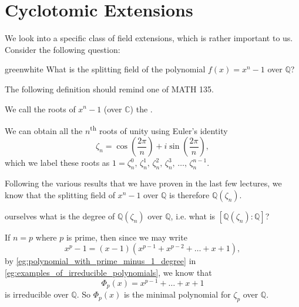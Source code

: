 \documentclass[notoc,notitlepage,nobib]{tufte-book}
\begin{document}

\section{Cyclotomic Extensions}%
\label{sec:cyclotomic_extensions}

We look into a specific class of field extensions, which is rather important to us.
Consider the following question:

\begin{quotebox}{green}{white}
  What is the splitting field of the polynomial $f(x) = x^n - 1$ over $\mathbb{Q}$?
\end{quotebox}

The following definition should remind one of MATH 135.

\begin{defn}\label{defn:_n_th_roots_of_unity}
  We call the roots of $x^n - 1$ (over $\mathbb{C}$) the .
\end{defn}

\begin{eg}
  We can obtain all the $n$\textsuperscript{th} roots of unity using Euler's identity
  \begin{equation*}
    \zeta_n = \cos \left( \frac{2\pi}{n} \right) + i \sin \left( \frac{2 \pi}{n} \right),
  \end{equation*}
  which we label these roots as $1 = \zeta_n^0,\, \zeta_n^1,\, \zeta_n^2,\,
  \zeta_n^3,\, \ldots,\, \zeta_n^{n - 1}$.
\end{eg}

Following the various results that we have proven in the last few lectures, we know that
the splitting field of $x^n - 1$ over $\mathbb{Q}$ is therefore
$\mathbb{Q}(\zeta_n)$.

 ourselves what is the degree of $\mathbb{Q}(\zeta_n)$ over
$\mathbb{Q}$, i.e. what is $[ \mathbb{Q}(\zeta_n) : \mathbb{Q} ]$?

If $n = p$ where $p$ is prime, then since we may write
\begin{equation*}
  x^p - 1 = (x - 1)(x^{p - 1} + x^{p - 2} + \hdots + x + 1),
\end{equation*}
by \cref{eg:polynomial_with_prime_minus_1_degree} in
\cref{eg:examples_of_irreducible_polynomials}, we know that
\begin{equation*}
  \Phi_p(x) = x^{p - 1} + \hdots + x + 1
\end{equation*}
is irreducible over $\mathbb{Q}$. So $\Phi_p(x)$ is the minimal polynomial for
$\zeta_p$ over $\mathbb{Q}$.
\end{document}
